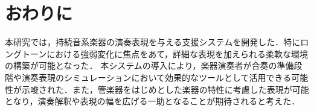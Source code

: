 \section{おわりに}
本研究では，持続音系楽器の演奏表現を与える支援システムを開発した．特にロングトーンにおける強弱変化に焦点をあて，詳細な表現を加えられる柔軟な環境の構築が可能となった．
本システムの導入により，楽器演奏者が合奏の準備段階や演奏表現のシミュレーションにおいて効果的なツールとして活用できる可能性が示唆された．また，管楽器をはじめとした楽器の特性に考慮した表現が可能となり，演奏解釈や表現の幅を広げる一助となることが期待されると考えた．





